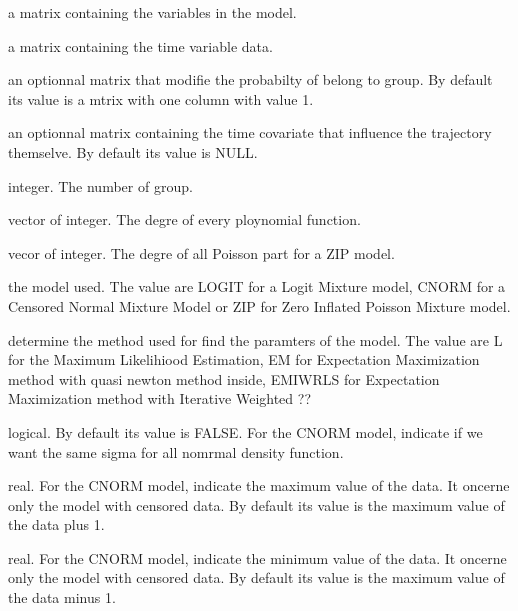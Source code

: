\documentclass{article}\usepackage[]{graphicx}\usepackage[]{color}
\begin{document}
\begin{Arguments}
	\begin{ldescription}
		\item[\code{Y}] a matrix containing the variables in the model.

		\item[\code{A}] a matrix containing the time variable data.
		
		\item[\code{Risk}] an optionnal matrix that modifie the probabilty of belong to group. By default its value is a mtrix
		with one column  with value 1.

		\item[\code{TCOV}] an optionnal matrix containing the time covariate that influence the trajectory themselve.
		By default its value is NULL.

		\item[\code{ng}] integer. The number of group.

		\item[\code{degre}] vector of integer. The degre of every ploynomial function.

		\item[\code{degre.nu}] vecor of integer. The degre of all Poisson part for a ZIP model.

		\item[\code{Model}] the model used. The value are LOGIT for a Logit Mixture model,
		CNORM for a Censored Normal Mixture Model or ZIP for Zero Inflated Poisson Mixture model.

		\item[\code{Method}] determine the method used for find the paramters of the model.
		The value are L for the Maximum Likelihiood Estimation, EM for Expectation Maximization method
		with quasi newton method inside, EMIWRLS for Expectation Maximization method with Iterative
		Weighted ??

		\item[\code{ssigma}] logical. By default its value is FALSE. For the CNORM model,
		indicate if we want the same sigma for all nomrmal density function.

		\item[\code{ymax}] real. For the CNORM model, indicate the maximum value of the data. It oncerne only the model
		with censored data. By default its value is the maximum value of the data plus 1.

		\item[\code{ymin}] real. For the CNORM model, indicate the minimum value of the data. It oncerne only the model
		with censored data. By default its value is the maximum value of the data minus 1.


\end{ldescription}
\end{Arguments}
\end{document}
